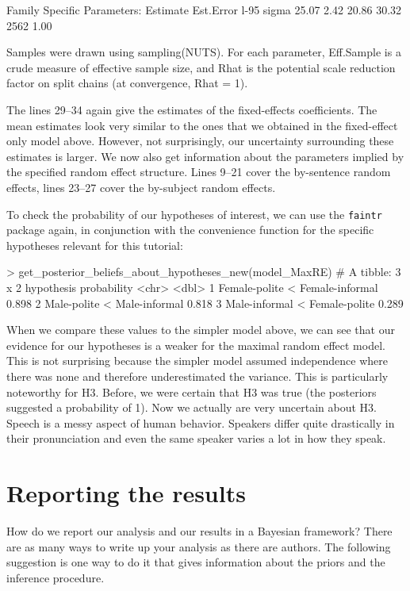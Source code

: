 \documentclass[nobib]{tufte-handout}
\begin{document}
\begin{minipage}[]{1.5\textwidth}
\begin{rc}
Family Specific Parameters: 
      Estimate Est.Error l-95%
sigma    25.07      2.42    20.86    30.32       2562 1.00

Samples were drawn using sampling(NUTS). For each parameter, Eff.Sample 
is a crude measure of effective sample size, and Rhat is the potential 
scale reduction factor on split chains (at convergence, Rhat = 1).
\end{rc}
\end{minipage}

The lines 29--34 again give the estimates of the fixed-effects coefficients. The mean estimates look very similar to the ones that we obtained in the fixed-effect only model above. However, not surprisingly, our uncertainty surrounding these estimates is larger.  
We now also get information about the parameters implied by the specified random effect
structure. Lines 9--21 cover the by-sentence random effects, lines 23--27 cover the by-subject
random effects.

To check the probability of our hypotheses of interest, we can use the \texttt{faintr} package again, in conjunction with the convenience function for the specific hypotheses relevant for this tutorial:

\medskip

\begin{minipage}[]{\textwidth}
\begin{rc}
> get_posterior_beliefs_about_hypotheses_new(model_MaxRE)
# A tibble: 3 x 2
  hypothesis                      probability
  <chr>                                 <dbl>
1 Female-polite < Female-informal       0.898
2 Male-polite < Male-informal           0.818
3 Male-informal < Female-polite         0.289
\end{rc}
\end{minipage}

When we compare these values to the simpler model above, we can see that our evidence for our hypotheses is a weaker for the maximal random effect model. This is not surprising because the simpler model assumed independence where there was none and therefore underestimated the variance. This is particularly noteworthy for H3. Before, we were certain that H3 was true (the posteriors suggested a probability of 1). Now we actually are very uncertain about H3. Speech is a messy aspect of human behavior. Speakers differ quite drastically in their pronunciation and even the same speaker varies a lot in how they speak.

\section{Reporting the results}
How do we report our analysis and our results in a Bayesian framework? There are as many ways to write up your analysis as there are authors. The following suggestion is one way to do it that gives information about the priors and the inference procedure.
\end{document}
